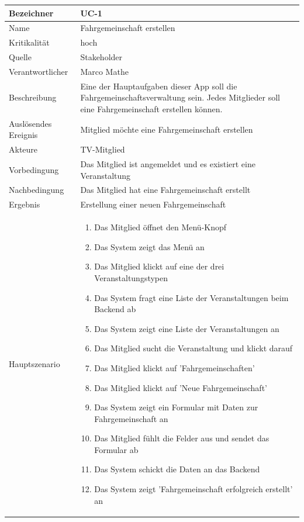 \begin{table}[ht]
\centering
  \begin{tabular}{ l | p{10cm} }
	\hline
	\rowcolor{gray}
	Bezeichner		&	UC-1\\ \hline
	Name			&	Fahrgemeinschaft erstellen\\ \hline
	Kritikalität		&	hoch\\ \hline
	Quelle			&	Stakeholder\\ \hline
	Verantwortlicher	&	Marco Mathe\\ \hline
	Beschreibung	&	Eine der Hauptaufgaben dieser App soll die Fahrgemeinschaftsverwaltung sein. Jedes Mitglieder soll eine Fahrgemeinschaft erstellen können.\\ \hline
	Auslösendes Ereignis&	Mitglied möchte eine Fahrgemeinschaft erstellen\\ \hline
	Akteure		&	TV-Mitglied\\ \hline
	Vorbedingung	&	Das Mitglied ist angemeldet und es existiert eine Veranstaltung\\ \hline
	Nachbedingung	&	Das Mitglied hat eine Fahrgemeinschaft erstellt\\ \hline
	Ergebnis		&	Erstellung einer neuen Fahrgemeinschaft\\ \hline
	Hauptszenario	&	\begin{enumerate}
					\item Das Mitglied öffnet den Menü-Knopf
					\item Das System zeigt das Menü an
					\item Das Mitglied klickt auf eine der drei Veranstaltungstypen
					\item Das System fragt eine Liste der Veranstaltungen beim Backend ab
					\item Das System zeigt eine Liste der Veranstaltungen an
					\item Das Mitglied sucht die Veranstaltung und klickt darauf
					\item Das Mitglied klickt auf 'Fahrgemeinschaften'
					\item Das Mitglied klickt auf 'Neue Fahrgemeinschaft'
					\item Das System zeigt ein Formular mit Daten zur Fahrgemeinschaft an
					\item Das Mitglied fühlt die Felder aus und sendet das Formular ab
					\item Das System schickt die Daten an das Backend
					\item Das System zeigt 'Fahrgemeinschaft erfolgreich erstellt' an
					\end{enumerate}

\end{tabular}
\end{table}
